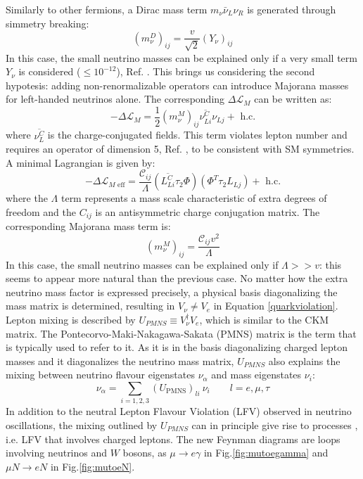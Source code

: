 Similarly to other fermions, a Dirac mass term $m_{\nu} \bar{\nu}_L \nu_R$ is generated through simmetry breaking:
\begin{equation}
\left(m_\nu^D\right)_{i j}=\frac{v}{\sqrt{2}}\left(Y_\nu\right)_{i j}
\end{equation}
In this case, the small neutrino masses can be explained only if a very small term $Y_\nu$ is considered ($\leq 10^{-12}$), Ref. \cite{clfv_signorelli}. This brings us considering the second hypotesis: adding non-renormalizable operators can introduce Majorana masses for left-handed neutrinos alone. The corresponding $\Delta \mathscr{L}_M$ can be written as:
\begin{equation}
-\Delta \mathscr{L}_M=\frac{1}{2}\left(m_\nu^M\right)_{i j} \overline{\nu_{L i}^C} \nu_{L j}+\text{ h.c.}
\end{equation}
where $\overline{\nu_{L }^C} $ is the charge-conjugated fields. This term violates lepton number and requires an operator of dimension 5, Ref. \cite{wein}, to be consistent with SM symmetries. A minimal Lagrangian is given by:
\begin{equation}
-\Delta \mathscr{L}_{M \text { eff}}=\frac{\mathcal{C}_{i j}}{\Lambda}\left(\overline{L_{L i}^C} \tau_2 \Phi\right)\left(\Phi^T \tau_2 L_{L j}\right)+\text { h.c.}
\end{equation}
where the $\Lambda$ term represents a mass scale characteristic of extra degrees of freedom and the $C_{ij}$ is an antisymmetric charge conjugation matrix. The corresponding Majorana mass term is:
\begin{equation}
\left(m_\nu^M\right)_{i j}=\frac{\mathcal{C}_{i j} v^2}{\Lambda}
\end{equation}
In this case, the small neutrino masses can be explained only if $\Lambda > > v$: this seems to appear more natural than the previous case. No matter how the extra neutrino mass factor is expressed precisely, a physical basis diagonalizing the mass matrix is determined, resulting in $V_{\nu} \neq V_e$ in Equation \ref{quarkviolation}. Lepton mixing is described by $U_{PMNS} \equiv V_{\nu}^{\dagger} V_e$, which is similar to the CKM matrix. The Pontecorvo-Maki-Nakagawa-Sakata (PMNS) matrix is the term that is typically used to refer to it. As it is in the basis diagonalizing charged lepton masses and it diagonalizes the neutrino mass matrix, $U_{PMNS}$ also explains the mixing between neutrino flavour eigenstates $\nu_{\alpha}$ and mass eigenstates $\nu_i$:
\begin{equation}
\nu_\alpha=\sum_{i=1,2,3}\left(U_{\mathrm{PMNS}}\right)_{l i} \ \nu_i \qquad l=e, \mu, \tau
\end{equation}
In addition to the neutral Lepton Flavour Violation (LFV) observed in neutrino oscillations, the mixing outlined by $U_{PMNS}$ can in principle give rise to  processes , i.e. LFV that involves charged leptons. The new Feynman diagrams are loops involving neutrinos and $W$ bosons, as $\mu \rightarrow e \gamma$ in Fig.\ref{fig:mutoegamma} and $\mu N \rightarrow e N$ in Fig.\ref{fig:mutoeN}. 



